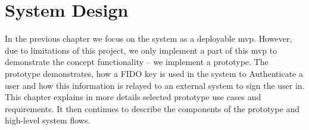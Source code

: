\section{System Design}\label{sec:design}

In the previous chapter we focus on the system as a deployable \acrlong{mvp}. However, due to limitations of this project, we only implement a part of this \acrshort{mvp} to demonstrate the concept functionality -- we implement a prototype. The prototype demonstrates, how a FIDO key is used in the system to Authenticate a user and how this information is relayed to an external system to sign the user in. This chapter explains in more details selected prototype use cases and requirements. It then continues to describe the components of the prototype and high-level system flows.









